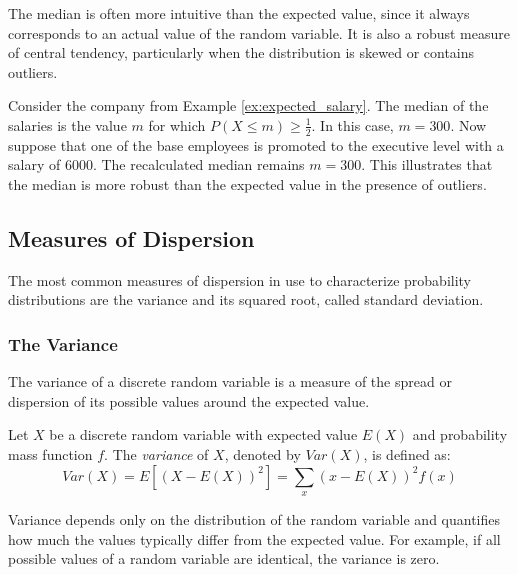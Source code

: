 The median is often more intuitive than the expected value, since it always corresponds to an actual value of the random variable. It is also a robust measure of central tendency, particularly when the distribution is skewed or contains outliers.

\begin{example}
Consider the company from Example \ref{ex:expected_salary}. The median of the salaries is the value $m$ for which $P(X \leq m) \geq \tfrac{1}{2}$. In this case, $m=300$. Now suppose that one of the base employees is promoted to the executive level with a salary of $6000$. The recalculated median remains $m=300$. This illustrates that the median is more robust than the expected value in the presence of outliers.
\end{example}

%
%

\subsection{Measures of Dispersion}

The most common measures of dispersion in use to characterize probability distributions are the variance and its squared root, called standard deviation.


\subsubsection*{The Variance}

The variance of a discrete random variable is a measure of the spread or dispersion of its possible values around the expected value.

\begin{definition}
Let $X$ be a discrete random variable with expected value $E(X)$ and probability mass function $f$. The \emph{variance} of $X$, denoted by $Var(X)$, is defined as:
\[
Var(X) = E[(X - E(X))^2] = \sum_{x} (x - E(X))^2 f(x)
\]
\end{definition}

Variance depends only on the distribution of the random variable and quantifies how much the values typically differ from the expected value. For example, if all possible values of a random variable are identical, the variance is zero.

